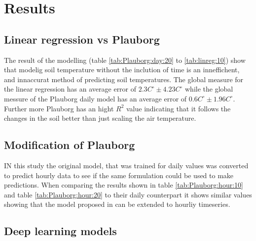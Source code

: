 \section{Results}


\subsection{Linear regression vs Plauborg}

The result of the modelling (table \ref{tab:Plauborg:day:20} to \ref{tab:linreg:10}) show that modelig soil temperature without the inclution of time is an inneffichent, and innaccurat method of predicting soil temperatures. The global measure for the linear regression has an average error of $2.3C^\circ \pm 4.23 C^\circ$ while the global messure of the Plauborg daily model has an average error of $0.6C^\circ \pm 1.96 C^\circ$. Further more Plauborg has an hight $R^2$ value indicating that it follows the changes in the soil better than just scaling the air temperature. 

\subsection{Modification of Plauborg}

IN this study the original model, that was trained for daily values was converted to predict hourly data to see if the same formulation could be used to make predictions. When comparing the results shown in table \ref{tab:Plauborg:hour:10} and table \ref{tab:Plauborg:hour:20} to their daily counterpart it shows similar values showing that the model proposed in \citeauthor{plauborg_simple_2002} can be extended to hourliy timeseries.

\subsection{Deep learning models}
